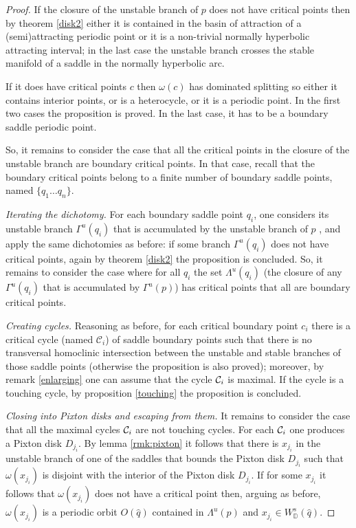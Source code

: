\documentclass[a4paper,11pt]{article}
\theoremstyle{definition}
\def\DD{{\mathbb D}}
\def\La{\Lambda}
\def\Ga{\Gamma}
\def\La{\Lambda}
\def\Ga{\Gamma}
\begin{document}
\begin{proof} 

 If  the closure of the unstable branch of $p$ does not have critical points then by theorem \ref{disk2} either it is contained in the basin of attraction of a (semi)attracting periodic point or it is a non-trivial normally hyperbolic attracting interval; in the last case the unstable branch crosses the stable manifold of a saddle in the normally hyperbolic arc. 

If it does have  critical points $c$  then $\omega(c)$ has dominated splitting so either it contains interior points, or is a heterocycle, or it is a periodic point.  In the first two  cases the proposition is proved.  In the last case, it has to be a boundary saddle periodic point. 

So, it remains to consider the case that all the critical points in the closure of the unstable branch are  boundary critical points. In that case, recall that the boundary critical points  belong to a finite number of boundary saddle points, named $\{q_1
\dots q_n\}$. 

\emph{Iterating the dichotomy.} For each boundary saddle point $q_i$, one considers its unstable branch  $\Ga^u(q_i)$ that is accumulated by the unstable branch of $p$ , and apply the same dichotomies as before: if  some  branch $\Gamma^u(q_i)$  does not have critical points, again by theorem \ref{disk2}  the proposition is concluded. So, it remains to consider the case where for all $q_i$ the set $\La^u(q_i)$ (the closure of any $\Ga^u(q_i)$ that is accumulated by $\Ga^u(p)$) has critical points that all are boundary critical points.



\emph{Creating cycles.} Reasoning as  before, for each critical  boundary point $c_i$  there is  a critical cycle (named ${\mathcal C}_i$) of saddle boundary points such that there is no transversal homoclinic intersection between the unstable and stable branches of those saddle points (otherwise the proposition is also proved); moreover, by remark \ref{enlarging} one can assume that the cycle ${\cal C}_i$  is maximal. If the cycle is a touching cycle, by proposition \ref{touching} the proposition  is concluded. 

\emph{Closing into Pixton disks and escaping from them.} It remains to  consider the case that all the  maximal cycles ${\cal C}_i$ are not  touching cycles. For each ${\cal C}_i$ one produces a  Pixton disk $D_{j_i}$. By lemma \ref{rmk:pixton} it follows that there is $x_{j_i}$  in the unstable branch of one of the saddles that bounds the Pixton disk $D_{j_i}$ such that $\omega(x_{j_i})$ is disjoint with  the interior of the Pixton disk $D_{j_i}$. If for  some $x_{j_i}$ it follows that $\omega(x_{j_i})$ does not have a critical point then, arguing as before, $\omega(x_{j_i})$ is a periodic orbit $O(\hat q)$ contained in $\La^u(p)$ and  $x_{j_i}\in W^s_\DD(\hat q)$. 


\end{proof}
\end{document}
